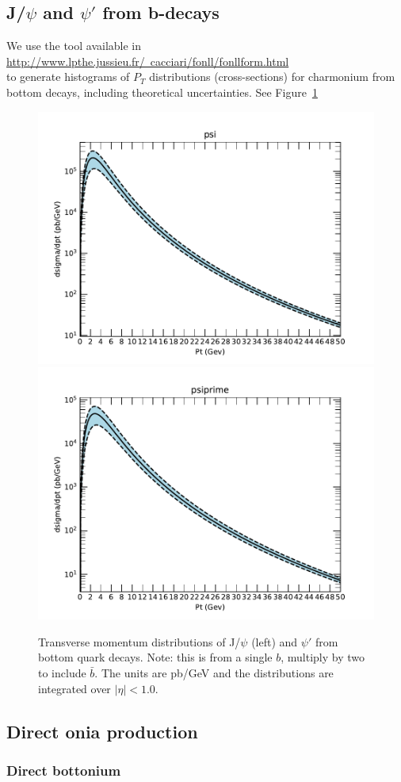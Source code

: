 \documentclass[12pt]{article}
\begin{document}
\subsection{J/$\psi$ and $\psi'$ from b-decays}
\label{sec:bpsi}
We use the tool available in \\
\href{http://www.lpthe.jussieu.fr/~cacciari/fonll/fonllform.html}
{http://www.lpthe.jussieu.fr/~cacciari/fonll/fonllform.html} \\
to
generate histograms of $P_T$ distributions (cross-sections) for charmonium from 
bottom decays, including theoretical 
uncertainties\cite{Cacciari:2012ny,Cacciari:2015fta}.  
See Figure~\ref{fig:bpsi} 

\begin{figure}
  \includegraphics[width=0.48\linewidth]{../oniaFromB/psi.pdf}
  \includegraphics[width=0.48\linewidth]{../oniaFromB/psiprime.pdf}
  \caption{Transverse momentum distributions of J/$\psi$ (left) 
and $\psi'$ from bottom quark decays. Note: this is from a single $b$, 
multiply by two to include $\bar{b}$. The units are pb/GeV and the 
distributions 
are integrated over $|\eta|<1.0$.}
  \label{fig:bpsi}
\end{figure}

  
\subsection{Direct onia production}
\label{sec:onia}

\subsubsection{Direct bottonium}
\label{sec:upsilon}
\end{document}
